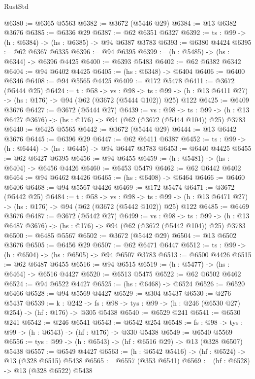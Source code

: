 \begin{lexlean}{RustStd}
\begin{coremodule}
{\begin{coremodule}
{{{{{{{{{{{@6380 := @6365 @5563
@6382 := @3672 (@5446 @29)
@6384 := @13 @6382 @3676
@6385 := @6336 @29
@6387 := @62 @6351 @6327
@6392 := {ts : @99} -> (h : @6384) -> (hs : @6385) -> @94 @6387 @3783
@6393 := @6380 @4424
@6395 := @62 @6367 @6335
@6396 := @94 @6395
@6399 := (h : @5485) -> (hs : @6344) -> @6396 @4425
@6400 := @6393 @5483
@6402 := @62 @6382 @6342
@6404 := @94 @6402 @4425
@6405 := (hs : @6348) -> @6404
@6406 := @6400 @6346
@6408 := @94 @5565 @4425
@6409 := @172 @5478
@6411 := @3672 (@5444 @25)
@6424 := {t : @58} ->
  {vs : @98} ->
  {ts : @99} -> (h : @13 @6411 @27) -> (hs : @176) -> @94 (@62 (@3672 (@5444 @102)) @25) @122
@6425 := @6409 @3676
@6427 := @3672 (@5444 @27)
@6439 := {vs : @98} ->
  {ts : @99} -> (h : @13 @6427 @3676) -> (hs : @176) -> @94 (@62 (@3672 (@5444 @104)) @25) @3783
@6440 := @6425 @5565
@6442 := @3672 (@5444 @29)
@6444 := @13 @6442 @3676
@6445 := @6396 @29
@6447 := @62 @6411 @6387
@6452 := {ts : @99} -> (h : @6444) -> (hs : @6445) -> @94 @6447 @3783
@6453 := @6440 @4425
@6455 := @62 @6427 @6395
@6456 := @94 @6455
@6459 := (h : @5481) -> (hs : @6404) -> @6456 @4426
@6460 := @6453 @5479
@6462 := @62 @6442 @6402
@6464 := @94 @6462 @4426
@6465 := (hs : @6408) -> @6464
@6466 := @6460 @6406
@6468 := @94 @5567 @4426
@6469 := @172 @5474
@6471 := @3672 (@5442 @25)
@6484 := {t : @58} ->
  {vs : @98} ->
  {ts : @99} -> (h : @13 @6471 @27) -> (hs : @176) -> @94 (@62 (@3672 (@5442 @102)) @25) @122
@6485 := @6469 @3676
@6487 := @3672 (@5442 @27)
@6499 := {vs : @98} ->
  {ts : @99} -> (h : @13 @6487 @3676) -> (hs : @176) -> @94 (@62 (@3672 (@5442 @104)) @25) @3783
@6500 := @6485 @5567
@6502 := @3672 (@5442 @29)
@6504 := @13 @6502 @3676
@6505 := @6456 @29
@6507 := @62 @6471 @6447
@6512 := {ts : @99} -> (h : @6504) -> (hs : @6505) -> @94 @6507 @3783
@6513 := @6500 @4426
@6515 := @62 @6487 @6455
@6516 := @94 @6515
@6519 := (h : @5477) -> (hs : @6464) -> @6516 @4427
@6520 := @6513 @5475
@6522 := @62 @6502 @6462
@6524 := @94 @6522 @4427
@6525 := (hs : @6468) -> @6524
@6526 := @6520 @6466
@6528 := @94 @5569 @4427
@6529 := @304 @5437
@6530 := @276 @5437
@6539 := {k : @242} ->
  {fs : @98} -> {tys : @99} -> (h : @246 (@6530 @27) @254) -> (hf : @176) -> @305 @5438
@6540 := @6529 @241
@6541 := @6530 @241
@6542 := @246 @6541
@6543 := @6542 @254
@6548 := {fs : @98} -> {tys : @99} -> (h : @6543) -> (hf : @176) -> @330 @5438
@6549 := @6540 @5569
@6556 := {tys : @99} -> (h : @6543) -> (hf : @6516 @29) -> @13 (@328 @6507) @5438
@6557 := @6549 @4427
@6563 := (h : @6542 @5416) -> (hf : @6524) -> @13 (@328 @6515) @5438
@6565 := @6557 (@353 @6541)
@6569 := (hf : @6528) -> @13 (@328 @6522) @5438
}}}}}}}}}}}
\end{coremodule}}
\end{coremodule}
\end{lexlean}
